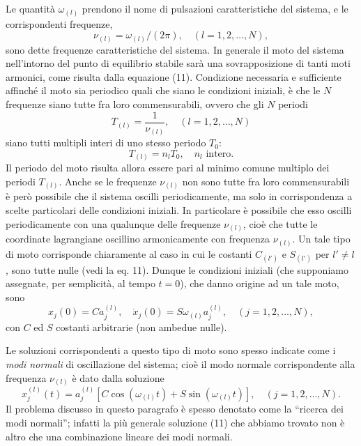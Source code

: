 \documentclass[11pt, a4paper]{book}
\numberwithin{equation}{section}
\begin{document}
Le quantità $\omega_{(l)}$ prendono il nome di pulsazioni caratteristiche del sistema, e le corrispondenti frequenze,
\begin{equation}
\nu_{(l)} = \omega_{(l)} / (2\pi), \quad (l = 1, 2, \dots, N),
\end{equation}
sono dette frequenze caratteristiche del sistema. In generale il moto del sistema nell'intorno del punto di equilibrio stabile sarà una sovrapposizione di tanti moti armonici, come risulta dalla equazione (11). Condizione necessaria e sufficiente affinché il moto sia periodico quali che siano le condizioni iniziali, è che le $N$ frequenze siano tutte fra loro commensurabili, ovvero che gli $N$ periodi
\begin{equation}
T_{(l)} = \frac{1}{\nu_{(l)}}, \quad (l = 1, 2, \dots, N)
\end{equation}
siano tutti multipli interi di uno stesso periodo $T_0$:
\begin{equation}
T_{(l)} = n_l T_0, \quad n_l \text{ intero.}
\end{equation}
Il periodo del moto risulta allora essere pari al minimo comune multiplo dei periodi $T_{(l)}$. Anche se le frequenze $\nu_{(l)}$ non sono tutte fra loro commensurabili è però possibile che il sistema oscilli periodicamente, ma solo in corrispondenza a scelte particolari delle condizioni iniziali. In particolare è possibile che esso oscilli periodicamente con una qualunque delle frequenze $\nu_{(l)}$, cioè che tutte le coordinate lagrangiane oscillino armonicamente con frequenza $\nu_{(l)}$. Un tale tipo di moto corrisponde chiaramente al caso in cui le costanti $C_{(l')}$ e $S_{(l')}$ per $l' \neq l$, sono tutte nulle (vedi la eq. 11). Dunque le condizioni iniziali (che supponiamo assegnate, per semplicità, al tempo $t = 0$), che danno origine ad un tale moto, sono
\begin{equation}
x_j(0) = C a_j^{(l)}, \quad \dot{x}_j(0) = S \omega_{(l)} a_j^{(l)}, \quad (j = 1, 2, \dots, N),
\end{equation}
con $C$ ed $S$ costanti arbitrarie (non ambedue nulle).

Le soluzioni corrispondenti a questo tipo di moto sono spesso indicate come i \textit{modi normali} di oscillazione del sistema; cioè il modo normale corrispondente alla frequenza $\nu_{(l)}$ è dato dalla soluzione
\begin{equation}
x_j^{(l)}(t) = a_j^{(l)} [C \cos(\omega_{(l)} t) + S \sin(\omega_{(l)} t)], \quad (j = 1, 2, \dots, N).
\end{equation}
Il problema discusso in questo paragrafo è spesso denotato come la ``ricerca dei modi normali''; infatti la più generale soluzione (11) che abbiamo trovato non è altro che una combinazione lineare dei modi normali.
\end{document}
